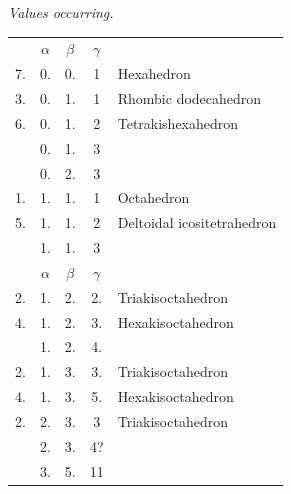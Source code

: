 \begin{center}\emph{Values occurring.}\end{center}
\begin{center}
\begin{tabular}{rccc l}
&$\alpha$&$\beta$&$\gamma$&\\
7.&0.&0.&1&Hexahedron\\
3.&0.&1.&1&Rhombic dodecahedron\\
6.&0.&1.&2&Tetrakishexahedron\\
&0.&1.&3&\\
&0.&2.&3&\\
1.&1.&1.&1&Octahedron\\
5.&1.&1.&2&Deltoidal icositetrahedron\\
&1.&1.&3&\\[1.2ex]
&$\alpha$&$\beta$&$\gamma$&\\
2.&1.&2.&2.&Triakisoctahedron\\
4.&1.&2.&3.&Hexakisoctahedron\\
&1.&2.&4.&\\
2.&1.&3.&3.&Triakisoctahedron\\
4.&1.&3.&5.&Hexakisoctahedron\\
2.&2.&3.&3&Triakisoctahedron\\
&2.&3.&4?&\\
&3.&5.&11&
\end{tabular}
\end{center}
